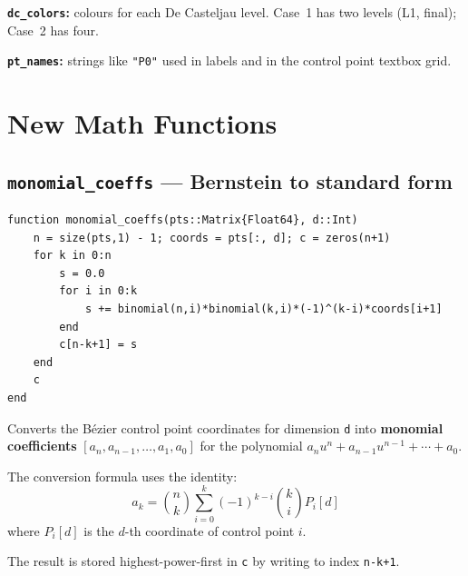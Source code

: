 \documentclass[12pt, a4paper]{article}
\newcommand{\cd}[1]{\texttt{#1}}
\begin{document}
\textbf{\cd{dc\_colors}:} colours for each De Casteljau level.
Case~1 has two levels (L1, final); Case~2 has four.

\textbf{\cd{pt\_names}:} strings like \cd{"P0"} used
in labels and in the control point textbox grid.


\section{New Math Functions}

\subsection{\texttt{monomial\_coeffs} --- Bernstein to standard form}

\begin{verbatim}
function monomial_coeffs(pts::Matrix{Float64}, d::Int)
    n = size(pts,1) - 1; coords = pts[:, d]; c = zeros(n+1)
    for k in 0:n
        s = 0.0
        for i in 0:k
            s += binomial(n,i)*binomial(k,i)*(-1)^(k-i)*coords[i+1]
        end
        c[n-k+1] = s
    end
    c
end
\end{verbatim}

Converts the B\'ezier control point coordinates for
dimension \cd{d} into \textbf{monomial coefficients}
$[a_n, a_{n-1}, \ldots, a_1, a_0]$ for the polynomial
$a_n u^n + a_{n-1} u^{n-1} + \cdots + a_0$.

The conversion formula uses the identity:
\[
  a_k = \binom{n}{k} \sum_{i=0}^{k} (-1)^{k-i}
        \binom{k}{i} P_i[d]
\]
where $P_i[d]$ is the $d$-th coordinate of control point $i$.

The result is stored highest-power-first in \cd{c} by
writing to index \cd{n-k+1}.
\end{document}
